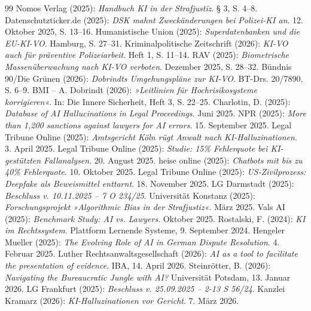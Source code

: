 \documentclass[12pt,a4paper]{article}
\begin{document}
\begin{thebibliography}{99}
		 Nomos Verlag (2025): \emph{Handbuch KI in der Strafjustiz}. § 3, S. 4–8.
		 Datenschutzticker.de (2025): \emph{DSK mahnt Zweckänderungen bei Polizei-KI an}. 12. Oktober 2025, S. 13–16.
		 Humanistische Union (2025): \emph{Superdatenbanken und die EU-KI-VO}. Hamburg, S. 27–31.
		 Kriminalpolitische Zeitschrift (2026): \emph{KI-VO auch für präventive Polizeiarbeit}. Heft 1, S. 11–14.
		 RAV (2025): \emph{Biometrische Massenüberwachung nach KI-VO verboten}. Dezember 2025, S. 28–32.
		 Bündnis 90/Die Grünen (2026): \emph{Dobrindts Umgehungspläne zur KI-VO}. BT-Drs. 20/7890, S. 6–9.
		 BMI – A. Dobrindt (2026): \emph{»Leitlinien für Hochrisikosysteme korrigieren«}. In: Die Innere Sicherheit, Heft 3, S. 22–25.
		 Charlotin, D. (2025): \emph{Database of AI Hallucinations in Legal Proceedings}. Juni 2025.
		 NPR (2025): \emph{More than 1,200 sanctions against lawyers for AI errors}. 15. September 2025.
		 Legal Tribune Online (2025): \emph{Amtsgericht Köln rügt Anwalt nach KI-Halluzinationen}. 3. April 2025.
		 Legal Tribune Online (2025): \emph{Studie: 15\% Fehlerquote bei KI-gestützten Fallanalysen}. 20. August 2025.
		 heise online (2025): \emph{Chatbots mit bis zu 40\% Fehlerquote}. 10. Oktober 2025.
		 Legal Tribune Online (2025): \emph{US-Zivilprozess: Deepfake als Beweismittel enttarnt}. 18. November 2025.
		 LG Darmstadt (2025): \emph{Beschluss v. 10.11.2025 – 7 O 234/25}.
		 Universität Konstanz (2025): \emph{Forschungsprojekt »Algorithmic Bias in der Strafjustiz«}. März 2025.
		 Vals AI (2025): \emph{Benchmark Study: AI vs. Lawyers}. Oktober 2025.
		 Rostalski, F. (2024): \emph{KI im Rechtssystem}. Plattform Lernende Systeme, 9. September 2024.
		 Hengeler Mueller (2025): \emph{The Evolving Role of AI in German Dispute Resolution}. 4. Februar 2025.
		 Luther Rechtsanwaltsgesellschaft (2026): \emph{AI as a tool to facilitate the presentation of evidence}. IBA, 14. April 2026.
		 Steinrötter, B. (2026): \emph{Navigating the Bureaucratic Jungle with AI?} Universität Potsdam, 13. Januar 2026.
		 LG Frankfurt (2025): \emph{Beschluss v. 25.09.2025 – 2-13 S 56/24}.
		 Kanzlei Kramarz (2026): \emph{KI-Halluzinationen vor Gericht}. 7. März 2026.

\end{thebibliography}
\end{document}
